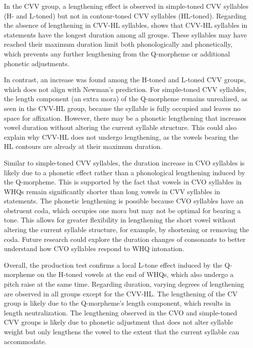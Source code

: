 \documentclass[output=paper,colorlinks,citecolor=brown
]{langscibook}
\begin{document}
In the CVV group, a lengthening effect is observed in simple-toned CVV syllables (H- and L-toned) but not in contour-toned CVV syllables (HL-toned). Regarding the absence of lengthening in CVV-HL syllables,  shows that CVV-HL syllables in statements have the longest duration among all groups. These syllables may have reached their maximum duration limit both phonologically and phonetically, which prevents any further lengthening from the Q-morpheme or additional phonetic adjustments.

In contrast, an increase was found among the H-toned and L-toned CVV groups, which does not align with Newman's prediction. For simple-toned CVV syllables, the length component (an extra mora) of the Q-morpheme remains unrealized, as seen in the CVV-HL group, because the syllable is fully occupied and leaves no space for affixation. However, there may be a phonetic lengthening that increases vowel duration without altering the current syllable structure. This could also explain why CVV-HL does not undergo lengthening, as the vowels bearing the HL contours are already at their maximum duration. 

Similar to simple-toned CVV syllables, the duration increase in CVO syllables is likely due to a phonetic effect rather than a phonological lengthening induced by the Q-morpheme. This is supported by the fact that vowels in CVO syllables in WHQs remain significantly shorter than long vowels in CVV syllables in statements. The phonetic lengthening is possible because CVO syllables have an obstruent coda, which occupies one mora but may not be optimal for bearing a tone. This allows for greater flexibility in lengthening the short vowel without altering the current syllable structure, for example, by shortening or removing the coda. Future research could explore the duration changes of consonants to better understand how CVO syllables respond to WHQ intonation.

Overall, the production test confirms a local L-tone effect induced by the Q-morpheme on the H-toned vowels at the end of WHQs, which also undergo a pitch raise at the same time. Regarding duration, varying degrees of lengthening are observed in all groups except for the CVV-HL. The lengthening of the CV group is likely due to the Q-morpheme's length component, which results in length neutralization. The lengthening observed in the CVO and simple-toned CVV groups is likely due to phonetic adjustment that does not alter syllable weight but only lengthens the vowel to the extent that the current syllable can accommodate. 
\end{document}
